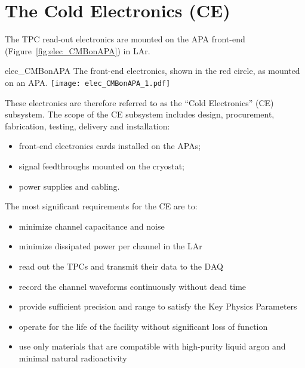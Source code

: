 \section{The Cold Electronics (CE)} 
\label{sec:detectors-fd-ref-ce}

The TPC read-out electronics are mounted on the APA front-end
(Figure~\ref{fig:elec_CMBonAPA}) in LAr.  
\begin{cdrfigure}{elec_CMBonAPA}
 {The front-end electronics, shown in the red circle, as mounted on an APA.}
\texttt{[image: elec\_CMBonAPA\_1.pdf]}
\end{cdrfigure}
These electronics are
therefore referred to as the ``Cold Electronics'' (CE) subsystem.  The
scope of the CE subsystem includes design, procurement,
fabrication, testing, delivery and installation:
\begin{itemize}
\item front-end electronics cards installed on the APAs;
\item signal feedthroughs mounted on the cryostat;
\item power supplies and cabling.
\end{itemize}
The most significant requirements for the CE are to:
\begin{itemize}	
\item minimize channel capacitance and noise
\item minimize dissipated power per channel in the LAr
\item read out the TPCs and transmit their data to the DAQ
\item record the channel waveforms continuously without dead time
\item provide sufficient precision and range to satisfy the Key Physics Parameters
\item operate for the life of the facility without significant loss of function
\item use only materials that are compatible with high-purity liquid argon and minimal natural radioactivity
\end{itemize}

